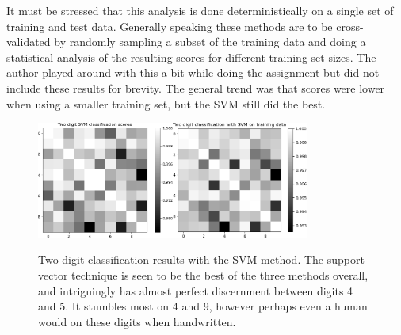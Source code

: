 \documentclass{article}
\begin{document}
It must be stressed that this analysis is done deterministically on a single set of training and test data. Generally speaking these methods are to be cross-validated by randomly sampling a subset of the training data and doing a statistical analysis of the resulting scores for different training set sizes. The author played around with this a bit while doing the assignment but did not include these results for brevity. The general trend was that scores were lower when using a smaller training set, but the SVM still did the best.

\begin{figure}[hb!]
  \centering
  \includegraphics[width=0.4\textwidth]{2dgt_svm_50modes}\quad\quad\quad\includegraphics[width=0.4\textwidth]{ontrainingdata/svm_training}
  \caption{Two-digit classification results with the SVM method. The support vector technique is seen to be the best of the three methods overall, and intriguingly has almost perfect discernment between digits 4 and 5. It stumbles most on 4 and 9, however perhaps even a human would on these digits when handwritten.}\label{svm}
\end{figure}
\end{document}
